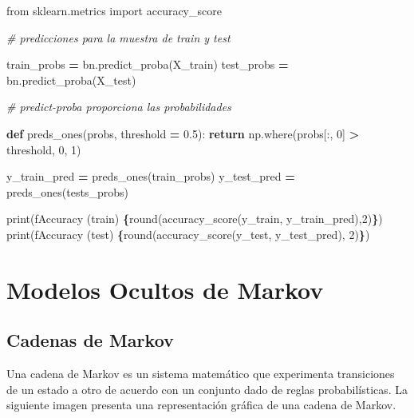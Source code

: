 \documentclass[
  a4paper,
  DIV=11,
  numbers=noendperiod]{scrreprt}
\newenvironment{Shaded}{\begin{snugshade}}{\end{snugshade}}
\newcommand{\BuiltInTok}[1]{#1}
\newcommand{\CommentTok}[1]{\textcolor[rgb]{0.56,0.35,0.01}{\textit{#1}}}
\newcommand{\ControlFlowTok}[1]{\textcolor[rgb]{0.13,0.29,0.53}{\textbf{#1}}}
\newcommand{\DecValTok}[1]{\textcolor[rgb]{0.00,0.00,0.81}{#1}}
\newcommand{\FloatTok}[1]{\textcolor[rgb]{0.00,0.00,0.81}{#1}}
\newcommand{\ImportTok}[1]{#1}
\newcommand{\KeywordTok}[1]{\textcolor[rgb]{0.13,0.29,0.53}{\textbf{#1}}}
\newcommand{\NormalTok}[1]{#1}
\newcommand{\OperatorTok}[1]{\textcolor[rgb]{0.81,0.36,0.00}{\textbf{#1}}}
\newcommand{\SpecialCharTok}[1]{\textcolor[rgb]{0.81,0.36,0.00}{\textbf{#1}}}
\newcommand{\SpecialStringTok}[1]{\textcolor[rgb]{0.31,0.60,0.02}{#1}}
\begin{document}
\begin{Shaded}
\begin{Highlighting}[numbers=left,,]
\ImportTok{from}\NormalTok{ sklearn.metrics }\ImportTok{import}\NormalTok{ accuracy\_score}

\CommentTok{\# predicciones para la muestra de train y test}

\NormalTok{train\_probs }\OperatorTok{=}\NormalTok{ bn.predict\_proba(X\_train)  }
\NormalTok{test\_probs }\OperatorTok{=}\NormalTok{ bn.predict\_proba(X\_test)}

\CommentTok{\# predict{-}proba proporciona las probabilidades}

\KeywordTok{def}\NormalTok{ preds\_ones(probs, threshold }\OperatorTok{=} \FloatTok{0.5}\NormalTok{):}
    \ControlFlowTok{return}\NormalTok{ np.where(probs[:, }\DecValTok{0}\NormalTok{] }\OperatorTok{\textgreater{}}\NormalTok{ threshold, }\DecValTok{0}\NormalTok{, }\DecValTok{1}\NormalTok{)}

\NormalTok{y\_train\_pred }\OperatorTok{=}\NormalTok{ preds\_ones(train\_probs)}
\NormalTok{y\_test\_pred }\OperatorTok{=}\NormalTok{ preds\_ones(tests\_probs)}

\BuiltInTok{print}\NormalTok{(}\SpecialStringTok{f\textquotesingle{}Accuracy (train) }\SpecialCharTok{\{}\BuiltInTok{round}\NormalTok{(accuracy\_score(y\_train, y\_train\_pred),}\DecValTok{2}\NormalTok{)}\SpecialCharTok{\}}\SpecialStringTok{\textquotesingle{}}\NormalTok{)}
\BuiltInTok{print}\NormalTok{(}\SpecialStringTok{f\textquotesingle{}Accuracy (test) }\SpecialCharTok{\{}\BuiltInTok{round}\NormalTok{(accuracy\_score(y\_test, y\_test\_pred), }\DecValTok{2}\NormalTok{)}\SpecialCharTok{\}}\SpecialStringTok{\textquotesingle{}}\NormalTok{)}
\end{Highlighting}
\end{Shaded}

\section{Modelos Ocultos de Markov}\label{modelos-ocultos-de-markov}

\subsection{Cadenas de Markov}\label{cadenas-de-markov}

Una cadena de Markov es un sistema matemático que experimenta
transiciones de un estado a otro de acuerdo con un conjunto dado de
reglas probabilísticas. La siguiente imagen presenta una representación
gráfica de una cadena de Markov.
\end{document}
